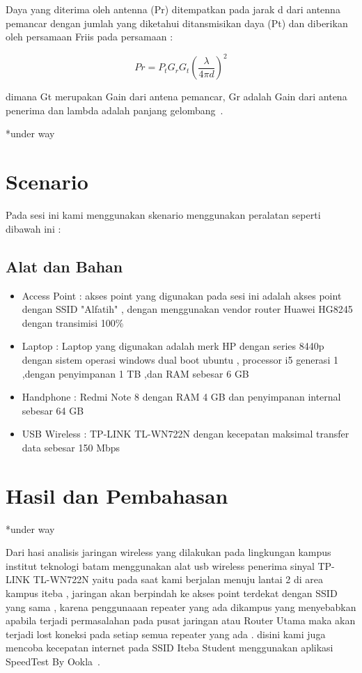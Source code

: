 \documentclass[conference]{IEEEtran}
\begin{document}
Daya yang diterima oleh antenna (Pr) ditempatkan pada jarak d
dari antenna pemancar dengan jumlah yang diketahui
ditansmisikan daya (Pt) dan diberikan oleh
persamaan Friis pada persamaan :

\begin{equation}
    Pr = P_t G_r G_t 
    \left( 
        \frac{\lambda}{4 \pi d}
    \right) ^2
\end{equation}

dimana Gt merupakan Gain dari antena pemancar, Gr
adalah Gain dari antena penerima  dan lambda adalah
panjang gelombang~. \cite{puspitasari2014analisis}

*under way

\section{Scenario}
Pada sesi ini kami menggunakan skenario menggunakan peralatan seperti dibawah ini :
\subsection{Alat dan Bahan}

\begin{itemize}
    \item Access Point : akses point yang digunakan pada sesi ini adalah akses point dengan SSID  "Alfatih" , dengan menggunakan vendor router Huawei HG8245 dengan transimisi 100\% 
    \item Laptop : Laptop yang digunakan adalah merk HP dengan series 8440p dengan sistem operasi windows dual boot ubuntu , processor i5 generasi 1 ,dengan penyimpanan 1 TB ,dan RAM sebesar 6 GB 
    \item Handphone : Redmi Note 8 dengan RAM 4 GB dan penyimpanan internal sebesar 64 GB 
    \item USB Wireless : TP-LINK TL-WN722N dengan kecepatan maksimal transfer data sebesar 150 Mbps
\end{itemize}



\section{Hasil dan Pembahasan}

*under way

Dari hasi analisis jaringan wireless yang dilakukan pada lingkungan kampus
institut teknologi batam menggunakan alat usb wireless penerima sinyal TP-LINK TL-WN722N yaitu pada saat kami berjalan menuju lantai 2 di area kampus iteba , jaringan akan berpindah
ke akses point terdekat dengan SSID yang sama , karena penggunaaan repeater yang ada dikampus yang menyebabkan apabila terjadi permasalahan
pada pusat jaringan atau Router Utama maka akan terjadi lost koneksi pada setiap semua repeater yang ada .
disini kami juga mencoba kecepatan internet pada SSID Iteba Student menggunakan aplikasi SpeedTest By Ookla~\cite{Ookla}.
\end{document}
